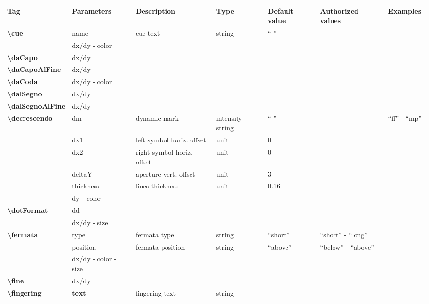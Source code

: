 \documentclass[a4paper, landscape, 10pt]{article}
\begin{document}
\begin{tabularx}{\linewidth}{p{3cm}p{3cm}p{5cm}p{3cm}p{2cm}p{3.5cm}p{4cm}}
    \hline
    \textbf{Tag}&\textbf{Parameters}&\textbf{Description}&\textbf{Type}&\textbf{Default value}&\textbf{Authorized values}&\textbf{Examples}\\
    \hline
    \textbf{\textbackslash{}cue}&name&cue text&string&`` ''&&\\
    &dx/dy - color&&&&&\\
    \hline
    \textbf{\textbackslash{}daCapo}&dx/dy&&&&&\\
    \hline
    \textbf{\textbackslash{}daCapoAlFine}&dx/dy&&&&&\\
    \hline
    \textbf{\textbackslash{}daCoda}&dx/dy - color&&&&&\\
    \hline
    \textbf{\textbackslash{}dalSegno}&dx/dy&&&&&\\
    \hline
    \textbf{\textbackslash{}dalSegnoAlFine}&dx/dy&&&&&\\
    \hline
    \textbf{\textbackslash{}decrescendo}&dm&dynamic mark&intensity string&`` ''&&``ff'' - ``mp''\\
    &dx1&left symbol horiz. offset&unit&0&&\\
    &dx2&right symbol horiz. offset&unit&0&&\\
    &deltaY&aperture vert. offset&unit&3&&\\
    &thickness&lines thickness&unit&0.16&&\\
    &dy - color&&&&&\\
    \hline    
    \textbf{\textbackslash{}dotFormat}&dd&&&&&\\ %
    &dx/dy - size&&&&&\\
    \hline
    \textbf{\textbackslash{}fermata}&type&fermata type&string&``short''&``short'' - ``long''&\\
    &position&fermata position&string&``above''&``below'' - ``above''&\\
    &dx/dy - color - size&&&&&\\
    \hline
    \textbf{\textbackslash{}fine}&dx/dy&&&&&\\
    \hline
    \textbf{\textbackslash{}fingering}&\textbf{text}&fingering text&string&&&\\

\end{tabularx}
\end{document}
